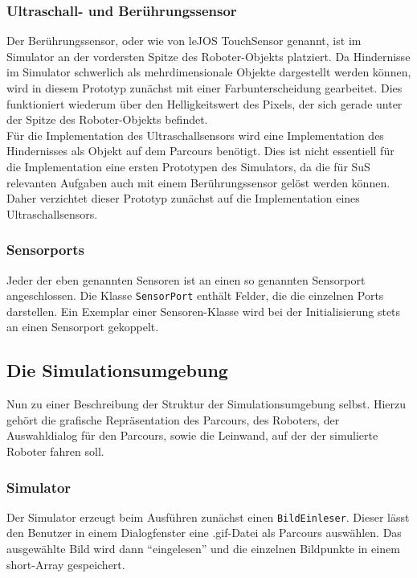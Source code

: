 \documentclass[paper=a4, pagesize, DIV=calc, BCOR=12.5mm, twoside=on, onecolumn=on, open = any, titlepage =on, parskip =half-, headsepline = on, footsepline = on, chapterprefix = on, appendixprefix = off, fontsize = 12pt, numbers = noenddot, abstract = on]{scrbook}
\numberwithin{equation}{chapter}
\theoremstyle{definition}
\theoremstyle{plain}
\theoremstyle{plain}
\theoremstyle{remark}
\theoremstyle{plain}
\theoremstyle{plain}
\begin{document}
\subsubsection{Ultraschall- und Berührungssensor}
Der Berührungssensor, oder wie von leJOS TouchSensor genannt, ist im Simulator an der vordersten Spitze des Roboter-Objekts platziert. Da Hindernisse im Simulator schwerlich als mehrdimensionale Objekte dargestellt werden können, wird in diesem Prototyp zunächst mit einer Farbunterscheidung gearbeitet. Dies funktioniert wiederum über den Helligkeitswert des Pixels, der sich gerade unter der Spitze des Roboter-Objekts befindet.\\

Für die Implementation des Ultraschallsensors wird eine Implementation des Hindernisses als Objekt auf dem Parcours benötigt. Dies ist nicht essentiell für die Implementation eine ersten Prototypen des Simulators, da die für SuS relevanten Aufgaben auch mit einem Berührungssensor gelöst werden können. Daher verzichtet dieser Prototyp zunächst auf die Implementation eines Ultraschallsensors.
\subsubsection{Sensorports}
Jeder der eben genannten Sensoren ist an einen so genannten Sensorport angeschlossen. Die Klasse \texttt{SensorPort} enthält Felder, die die einzelnen Ports darstellen. Ein Exemplar einer Sensoren-Klasse wird bei der Initialisierung stets an einen Sensorport gekoppelt. 

\par \singlespacing
\subsection{Die Simulationsumgebung}
\onehalfspacing
Nun zu einer Beschreibung der Struktur der Simulationsumgebung selbst. Hierzu gehört die grafische Repräsentation des Parcours, des Roboters, der Auswahldialog für den Parcours, sowie die Leinwand, auf der der simulierte Roboter fahren soll.
\subsubsection{Simulator}
Der Simulator erzeugt beim Ausführen zunächst einen \texttt{BildEinleser}. Dieser lässt den Benutzer in einem Dialogfenster eine .gif-Datei als Parcours auswählen. Das ausgewählte Bild wird dann "`eingelesen"' und die einzelnen Bildpunkte in einem short-Array gespeichert.
\end{document}
